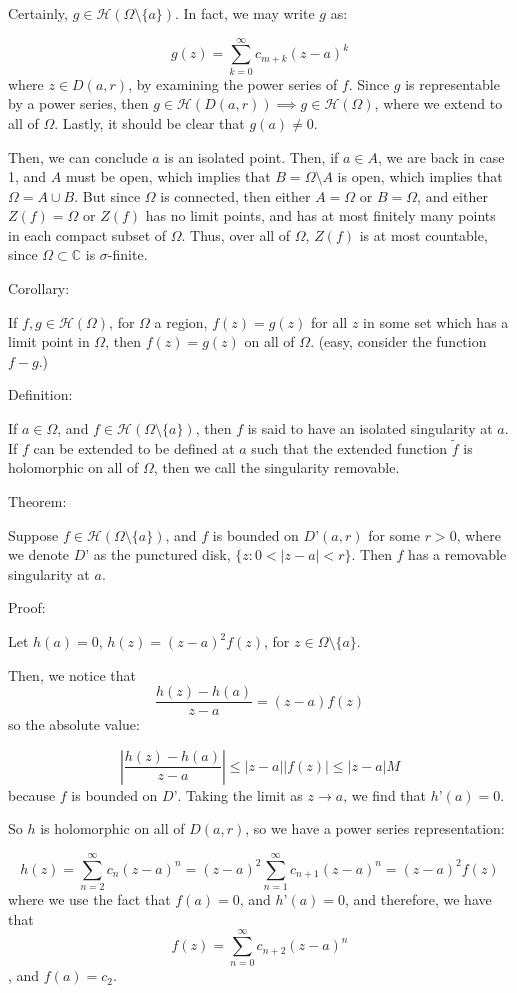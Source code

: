 \documentclass[10pt]{article}
\newcommand{\calH}{\mathcal{H}}
\begin{document}
Certainly, $g \in \calH(\Omega \setminus \{ a \})$. In fact, we may write $g$ as:

$$ g(z) = \sum_{k=0}^\infty c_{m+k} (z-a)^k$$ where $z \in D(a,r)$, by examining the power series of $f$. Since $g$ is representable by a power series, then $g \in \calH(D(a,r)) \implies g \in \calH(\Omega)$, where we extend to all of $\Omega$. Lastly, it should be clear that $g(a) \not = 0$. 

Then, we can conclude $a$ is an isolated point. Then, if $a \in A$, we are back in case 1, and $A$ must be open, which implies that $B = \Omega \setminus A$ is open, which implies that $\Omega = A \cup B$. But since $\Omega$ is connected, then either $A = \Omega$ or $B = \Omega$, and either $Z(f) = \Omega$ or $Z(f)$ has no limit points, and has at most finitely many points in each compact subset of $\Omega$. Thus, over all of $\Omega$, $Z(f)$ is at most countable, since $\Omega \subset \mathbb{C}$ is $\sigma$-finite.

Corollary:

If $f, g \in \calH(\Omega)$, for $\Omega$ a region, $f(z) = g(z)$ for all $z$ in some set which has a limit point in $\Omega$, then $f(z) = g(z)$ on all of $\Omega$. (easy, consider the function $f - g$.)

Definition:

If $a \in \Omega$, and $f \in \calH(\Omega \setminus \{ a \})$, then $f$ is said to have an isolated singularity at $a$. If $f$ can be extended to be defined at $a$ such that the extended function $\tilde{f}$ is holomorphic on all of $\Omega$, then we call the singularity removable.

Theorem:

Suppose $f \in \calH(\Omega \setminus \{ a \})$, and $f$ is bounded on $D’(a,r)$ for some $r > 0$, where we denote $D’$ as the punctured disk, $\{ z : 0 < |z-a| < r \}$. Then $f$ has a removable singularity at $a$. 

Proof:

Let $h(a) = 0$, $h(z) = (z-a)^2 f(z)$, for $z \in \Omega \setminus \{ a \}$. 

Then, we notice that $$ \frac{h(z) - h(a)}{z-a}= (z-a) f(z)$$ so the absolute value:

$$  \left| \frac{h(z) - h(a)}{z-a} \right| \leq |z-a| |f(z)| \leq |z-a| M$$ because $f$ is bounded on $D’$. Taking the limit as $z \to a$, we find that $h’(a) = 0$.

So $h$ is holomorphic on all of $D(a,r)$, so we have a power series representation:

$$h(z) = \sum_{n=2}^\infty c_n(z-a)^n = (z-a)^2 \sum_{n=1}^\infty c_{n+1} (z-a)^n = (z-a)^2 f(z)$$ where we use the fact that $f(a) = 0$, and $h’(a) = 0$, and therefore, we have that $$ f(z) = \sum_{n=0}^\infty c_{n+2} (z-a)^n$$, and $f(a) = c_2$.
\end{document}
